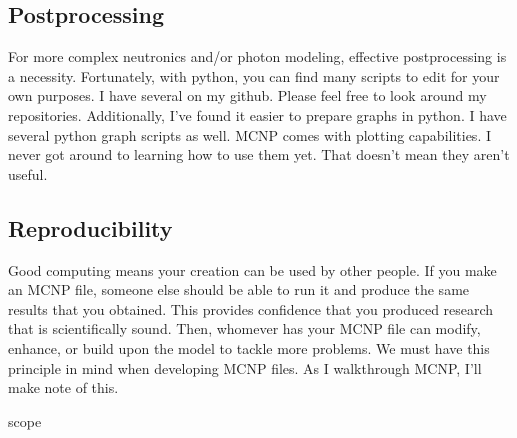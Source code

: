 \documentclass[11pt,a4paper]{article}
\begin{document}
\subsection{Postprocessing}
\noindent For more complex neutronics and/or photon modeling, effective postprocessing is a necessity. Fortunately, with python, you can find many scripts to edit for your own purposes. I have several on my github. Please feel free to look around my repositories. Additionally, I've found it easier to prepare graphs in python. I have several python graph scripts as well. MCNP comes with plotting capabilities. I never got around to learning how to use them yet. That doesn't mean they aren't useful.

\subsection{Reproducibility}
\noindent Good computing means your creation can be used by other people. If you make an MCNP file, someone else should be able to run it and produce the same results that you obtained. This provides confidence that you produced research that is scientifically sound. Then, whomever has your MCNP file can modify, enhance, or build upon the model to tackle more problems. We must have this principle in mind when developing MCNP files. As I walkthrough MCNP, I'll make note of this. 

\newpage

scope
\end{document}
